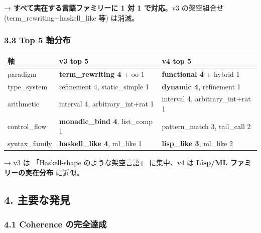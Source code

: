 \documentclass[
]{ltjsarticle}
\newcounter{none} %
\begin{document}
→ \textbf{すべて実在する言語ファミリーに 1 対 1 で対応}。v3 の架空組合せ
(term\_rewriting+haskell\_like 等) は消滅。

\subsubsection{3.3 Top 5 軸分布}\label{top-5-ux8ef8ux5206ux5e03}

{\def\LTcaptype{none} %
\begin{longtable}[]{@{}
  >{\raggedright\arraybackslash}p{}
  >{\raggedright\arraybackslash}p{}
  >{\raggedright\arraybackslash}p{}@{}}
\toprule\noalign{}
\begin{minipage}[b]{\linewidth}\raggedright
軸
\end{minipage} & \begin{minipage}[b]{\linewidth}\raggedright
v3 top 5
\end{minipage} & \begin{minipage}[b]{\linewidth}\raggedright
v4 top 5
\end{minipage} \\
\midrule\noalign{}
\endhead
\bottomrule\noalign{}
\endlastfoot
paradigm & \textbf{term\_rewriting 4} + oo 1 & \textbf{functional 4} +
hybrid 1 \\
type\_system & refinement 4, static\_simple 1 & \textbf{dynamic 4},
refinement 1 \\
arithmetic & interval 4, arbitrary\_int+rat 1 & interval 4,
arbitrary\_int+rat 1 \\
control\_flow & \textbf{monadic\_bind 4}, list\_comp 1 & pattern\_match
3, tail\_call 2 \\
syntax\_family & \textbf{haskell\_like 4}, ml\_like 1 &
\textbf{lisp\_like 3}, ml\_like 2 \\
\end{longtable}
}

→ v3 は 「Haskell-shape のような架空言語」 に集中、v4 は \textbf{Lisp/ML
ファミリーの実在分布} に近似。

\subsection{4. 主要な発見}\label{ux4e3bux8981ux306aux767aux898b}

\subsubsection{4.1 Coherence
の完全達成}\label{coherence-ux306eux5b8cux5168ux9054ux6210}
\end{document}

